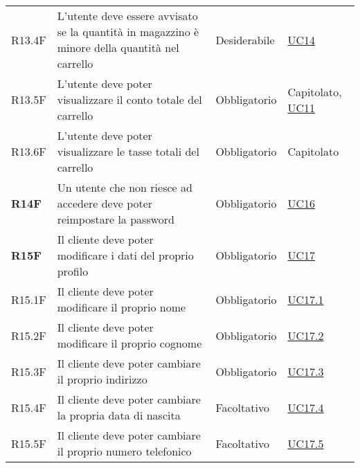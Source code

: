 \begin{center}
\begin{longtable}[!h]{p{50px} p{245px} p{75px} p{50px}}
        R13.4F                                & L'utente deve essere avvisato se la quantità in magazzino è minore della quantità nel carrello      & Desiderabile             & \hyperref[sec:UC14]{UC14}                      \\
        R13.5F                                & L'utente deve poter visualizzare il conto totale del carrello                                       & Obbligatorio             & Capitolato, \newline \hyperref[sec:UC11]{UC11} \\
        R13.6F                                & L'utente deve poter visualizzare le tasse totali del carrello                                       & Obbligatorio             & Capitolato                                     \\
        \textbf{R14F}                         & Un utente che non riesce ad accedere deve poter reimpostare la password                             & Obbligatorio             & \hyperref[sec:UC16]{UC16}                      \\
        \textbf{R15F}                         & Il cliente deve poter modificare i dati del proprio profilo                                         & Obbligatorio             & \hyperref[sec:UC17]{UC17}                      \\
        R15.1F                                & Il cliente deve poter modificare il proprio nome                                                    & Obbligatorio             & \hyperref[sec:UC17.1]{UC17.1}                  \\
        R15.2F                                & Il cliente deve poter modificare il proprio cognome                                                 & Obbligatorio             & \hyperref[sec:UC17.2]{UC17.2}                  \\
        R15.3F                                & Il cliente deve poter cambiare il proprio indirizzo                                                 & Obbligatorio             & \hyperref[sec:UC17.3]{UC17.3}                  \\
        R15.4F                                & Il cliente deve poter cambiare la propria data di nascita                                           & Facoltativo              & \hyperref[sec:UC17.4]{UC17.4}                  \\
        R15.5F                                & Il cliente deve poter cambiare il proprio numero telefonico                                         & Facoltativo              & \hyperref[sec:UC17.5]{UC17.5}                  \\

\end{longtable}
\end{center}
